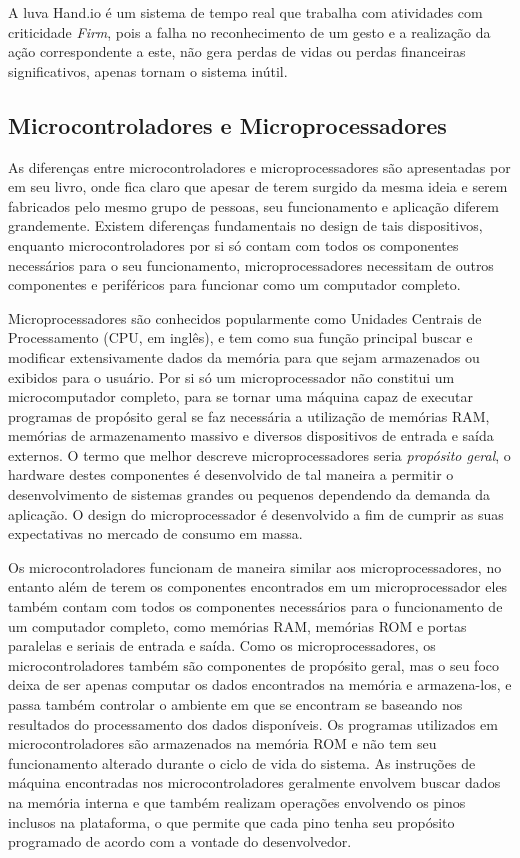 A luva Hand.io é um sistema de tempo real que trabalha com atividades com criticidade \textit{Firm}, pois a falha no reconhecimento de um gesto e a realização da ação correspondente a este, não gera perdas de vidas ou perdas financeiras significativos, apenas tornam o sistema inútil.


\subsection{Microcontroladores e Microprocessadores}%

As diferenças entre microcontroladores e microprocessadores são apresentadas por \cite{ayala:1991} em seu livro, onde fica claro que apesar de terem surgido da mesma ideia e serem fabricados pelo mesmo grupo de pessoas, seu funcionamento e aplicação diferem grandemente. Existem diferenças fundamentais no design de tais dispositivos, enquanto microcontroladores por si só contam com todos os componentes necessários para o seu funcionamento, microprocessadores necessitam de outros componentes e periféricos para funcionar como um computador completo.

Microprocessadores são conhecidos popularmente como Unidades Centrais de Processamento (CPU, em inglês), e tem como sua função principal buscar e modificar extensivamente dados da memória para que sejam armazenados ou exibidos para o usuário. Por si só um microprocessador não constitui um microcomputador completo, para se tornar uma máquina capaz de executar programas de propósito geral se faz necessária a utilização de memórias RAM, memórias de armazenamento massivo e diversos dispositivos de entrada e saída externos. O termo que melhor descreve microprocessadores seria \textit{propósito geral}, o hardware destes componentes é desenvolvido de tal maneira a permitir o desenvolvimento de sistemas grandes ou pequenos dependendo da demanda da aplicação. O design do microprocessador é desenvolvido a fim de cumprir as suas expectativas no mercado de consumo em massa.

Os microcontroladores funcionam de maneira similar aos microprocessadores, no entanto além de terem os componentes encontrados em um microprocessador eles também contam com todos os componentes necessários para o funcionamento de um computador completo, como memórias RAM, memórias ROM e portas paralelas e seriais de entrada e saída. Como os microprocessadores, os microcontroladores também são componentes de propósito geral, mas o seu foco deixa de ser apenas computar os dados encontrados na memória e armazena-los, e passa também controlar o ambiente em que se encontram se baseando nos resultados do processamento dos dados disponíveis. Os programas utilizados em microcontroladores são armazenados na memória ROM e não tem seu funcionamento alterado durante o ciclo de vida do sistema. As instruções de máquina encontradas nos microcontroladores geralmente envolvem buscar dados na memória interna e que também realizam operações envolvendo os pinos inclusos na plataforma, o que permite que cada pino tenha seu propósito programado de acordo com a vontade do desenvolvedor.

